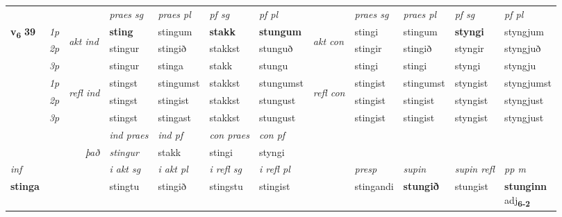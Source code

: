 \begin{longtable}[l]{X>{\footnotesize\itshape}llXXXXlXXXX}
 & &   & \textit{praes sg}  & \textit{praes pl}    & \textit{ pf sg} & \textit{pf pl} & & \textit{praes sg}  & \textit{praes pl}    & \textit{pf sg} & \textit{pf pl }  \\ \cmidrule{4-7} \cmidrule{9-12}
 \multirow{2}{*}{{{\textbf{v{\textsubscript{6}}} \Large{\textbf{39}}}}}  & 1p & \multirow{3}{*}{\begin{turn}{90}\textit{akt ind}\end{turn}} & \textbf{sting} & stingum & \textbf{stakk} & \textbf{stungum} & \multirow{3}{*}{\begin{turn}{90}\textit{akt con}\end{turn}} &stingi & stingum & \textbf{styngi} & styngjum\\*
 & 2p &  &  stingur  & stingið & stakkst & stunguð & & stingir & stingið & styngir & styngjuð \\*
 & 3p &  & stingur & stinga & stakk & stungu & & stingi & stingi& styngi & styngju \\*
\cmidrule{4-7} \cmidrule{9-12}
 & 1p & \multirow{3}{*}{\begin{turn}{90}\textit{refl ind}\end{turn}}  & stingst & stingumst & stakkst & stungumst & \multirow{3}{*}{\begin{turn}{90}\textit{refl con}\end{turn}}  &stingist & stingumst & styngist & styngjumst \\*
 & 2p &  & stingst & stingist & stakkst & stungust & &stingist & stingist & styngist & styngjust \\*
 & 3p  & & stingst & stingast & stakkst & stungust & & stingist & stingist& styngist & styngjust \\*
\cmidrule{4-7} \cmidrule{9-12}

   && &  \textit{ind praes} & \textit{ind pf} & \textit{con praes} & \textit{con pf} \\*
\multicolumn{3}{r}{\textit{það}} & stingur & stakk & stingi & styngi \\*

\cmidrule{4-7}
   {\textit{inf}} & &  & \textit{i akt sg} & \textit{i akt pl} & \textit{i refl sg} & \textit{i refl pl} && \textit{presp} & \textit{supin} & \textit{supin refl} & \textit{pp m} \\*
  {\textbf{stinga}} & && stingtu  & stingið & stingstu & stingist && stingandi &  \textbf{stungið} & stungist & \specialcell{\textbf{stunginn} \\ adj\textbf{\textsubscript{6-2}}} \\*


\end{longtable}
